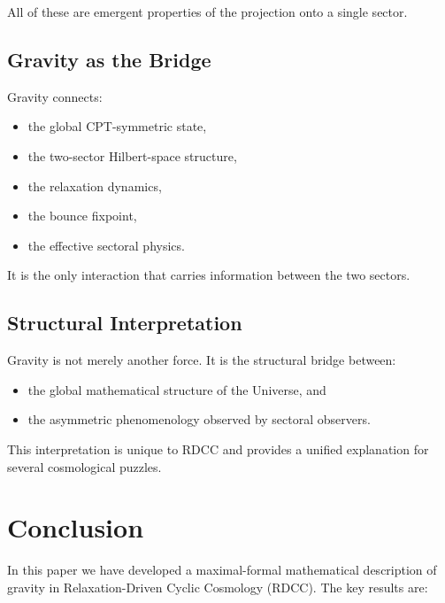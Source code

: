 \documentclass[11pt,a4paper]{article}
\begin{document}
All of these are emergent properties of the projection onto a single sector.

\subsection{Gravity as the Bridge}

Gravity connects:

\begin{itemize}
\item the global CPT-symmetric state,
\item the two-sector Hilbert-space structure,
\item the relaxation dynamics,
\item the bounce fixpoint,
\item the effective sectoral physics.
\end{itemize}

It is the only interaction that carries information between the two sectors.

\subsection{Structural Interpretation}

Gravity is not merely another force.  
It is the structural bridge between:

\begin{itemize}
\item the global mathematical structure of the Universe, and
\item the asymmetric phenomenology observed by sectoral observers.
\end{itemize}

This interpretation is unique to RDCC and provides a unified explanation for several cosmological puzzles.

\section{Conclusion}

In this paper we have developed a maximal-formal mathematical description of gravity in Relaxation-Driven Cyclic Cosmology (RDCC). The key results are:
\end{document}
